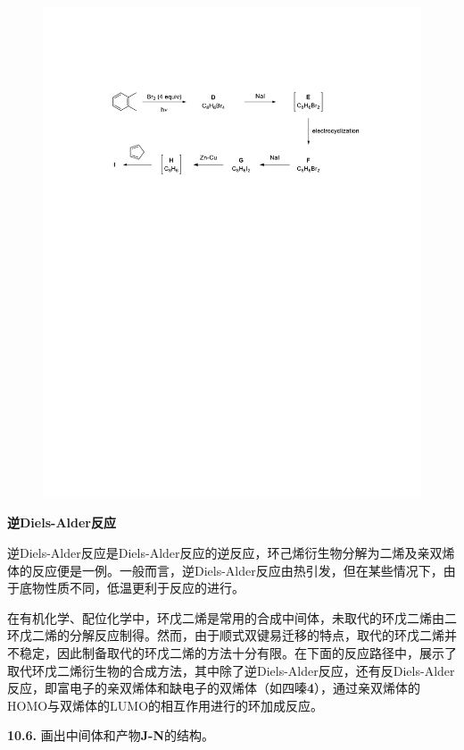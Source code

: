 \begin{figure}[h!]
	\centering
	\includegraphics[width=12cm]{./pic/t10-6.pdf}
\end{figure}

\noindent\textbf{逆Diels-Alder反应}

逆Diels-Alder反应是Diels-Alder反应的逆反应，环己烯衍生物分解为二烯及亲双烯体的反应便是一例。一般而言，逆Diels-Alder反应由热引发，但在某些情况下，由于底物性质不同，低温更利于反应的进行。

在有机化学、配位化学中，环戊二烯是常用的合成中间体，未取代的环戊二烯由二环戊二烯的分解反应制得。然而，由于顺式双键易迁移的特点，取代的环戊二烯并不稳定，因此制备取代的环戊二烯的方法十分有限。在下面的反应路径中，展示了取代环戊二烯衍生物的合成方法，其中除了逆Diels-Alder反应，还有反Diels-Alder反应，即富电子的亲双烯体和缺电子的双烯体（如四嗪\textbf{4}），通过亲双烯体的HOMO与双烯体的LUMO的相互作用进行的环加成反应。

\noindent\textbf{10.6.} 画出中间体和产物\textbf{J-N}的结构。

